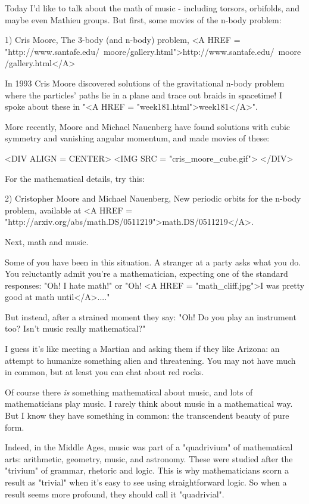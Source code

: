 



Today I'd like to talk about the math of music - including 
torsors, orbifolds, and maybe even Mathieu groups.   But first, 
some movies of the n-body problem:

1) Cris Moore, The 3-body (and n-body) problem, 
<A HREF =
"http://www.santafe.edu/~moore/gallery.html">http://www.santafe.edu/~moore/gallery.html</A>

In 1993 Cris Moore discovered solutions of the gravitational n-body
problem where the particles' paths lie in a plane and trace out braids
in spacetime!  I spoke about these in "<A HREF =
"week181.html">week181</A>".

More recently, Moore and Michael Nauenberg have found solutions 
with cubic symmetry and vanishing angular momentum, and made
movies of these:

<DIV ALIGN = CENTER>
<IMG SRC = "cris_moore_cube.gif">
</DIV>

For the mathematical details, try this:

2) Cristopher Moore and Michael Nauenberg, New periodic orbits for the
n-body problem, available at <A HREF =
"http://arxiv.org/abs/math.DS/0511219">math.DS/0511219</A>.

Next, math and music.

Some of you have been in this situation.  A stranger at a party 
asks what you do.  You reluctantly admit you're a mathematician, 
expecting one of the standard responses: "Oh!  I hate math!" or 
"Oh!  <A HREF = "math_cliff.jpg">I was pretty good at math 
until</A>...."  

But instead, after a strained moment they say: "Oh!  Do you play 
an instrument too?  Isn't music really mathematical?"  

I guess it's like meeting a Martian and asking them if they like 
Arizona: an attempt to humanize something alien and threatening.  
You may not have much in common, but at least you can chat about 
red rocks.

Of course there \emph{is} something mathematical about music, and lots
of mathematicians play music.  I rarely think about music in a 
mathematical way.  But I know they have something in common: the 
transcendent beauty of pure form.  

Indeed, in the Middle Ages, music was part of a "quadrivium" of 
mathematical arts: arithmetic, geometry, music, and astronomy. 
These were studied after the "trivium" of grammar, rhetoric and 
logic.  This is why mathematicians scorn a result as "trivial" 
when it's easy to see using straightforward logic.  So when a 
result seems more profound, they should call it "quadrivial".

